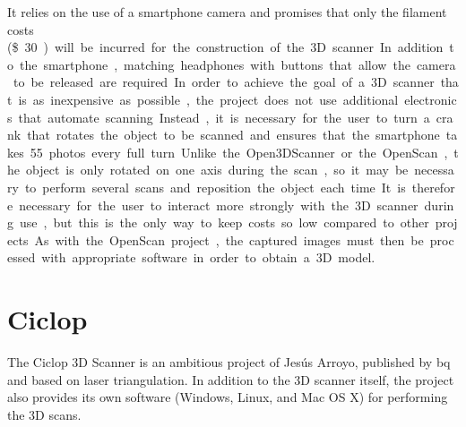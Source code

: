 %

It relies on the use of a smartphone camera and promises that only the filament costs (\SI[round-precision=2,round-mode=places,round-integer-to-decimal]{30}[\$]) will be incurred for the construction of the 3D scanner. In addition to the smartphone, matching headphones with buttons that allow the camera to be released are required.%

In order to achieve the goal of a 3D scanner that is as inexpensive as possible, the project does not use additional electronics that automate scanning. Instead, it is necessary for the user to turn a crank that rotates the object to be scanned and ensures that the smartphone takes 55 photos every full turn.%

Unlike the Open3DScanner or the OpenScan, the object is only rotated on one axis during the scan, so it may be necessary to perform several scans and reposition the object each time. It is therefore necessary for the user to interact more strongly with the 3D scanner during use, but this is the only way to keep costs so low compared to other projects.%

As with the OpenScan project, the captured images must then be processed with appropriate software in order to obtain a 3D model.%

\section{Ciclop}%
The Ciclop 3D Scanner is an ambitious project of Jesús Arroyo, published by bq and based on laser triangulation. In addition to the 3D scanner itself, the project also provides its own software (Windows, Linux, and Mac OS X) for performing the 3D scans.%

